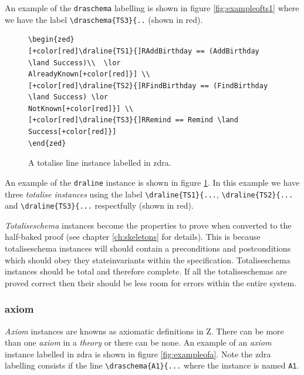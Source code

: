An example of the \verb|draschema| labelling is shown in figure
\ref{fig:exampleofts1} where we have the label \verb|\draschema{TS3}{..| (shown
in red).

\begin{figure}[H]
\centering
\begin{footnotesize}
\begin{BVerbatim}[commandchars=+\[\]]
\begin{zed} 
[+color[red]\draline{TS1}{]RAddBirthday == (AddBirthday \land Success)\\  \lor
AlreadyKnown[+color[red]}] \\
[+color[red]\draline{TS2}{]RFindBirthday == (FindBirthday \land Success) \lor
NotKnown[+color[red]}] \\
[+color[red]\draline{TS3}{]RRemind == Remind \land Success[+color[red]}]
\end{zed}
\end{BVerbatim}
\end{footnotesize}
\caption{\label{fig:exampleofts2} A totalise line instance labelled in \gls{zdra}.}
\end{figure}

An example of the \verb|draline| instance is shown in figure \ref{fig:exampleofts2}. In this example we have three \emph{totalise instances}
using the label \verb|\draline{TS1}{...|, \verb|\draline{TS2}{...| and
\verb|\draline{TS3}{...| respectfully (shown in red).

\emph{Totaliseschema} instances become the properties to prove when converted to the
half-baked proof (see chapter \ref{ch:skeletons} for details). This is because
totaliseschema instances will should contain a preconditions and postconditions
which should obey they stateinvariants within the specification. Totaliseschema
instances should be total and therefore complete. If all the totaliseschemas are
proved correct then their should be less room for errors within the entire
system.

\subsubsection{axiom}

\emph{Axiom} instances are knowns as axiomatic definitions in Z. There can be
more than one \emph{axiom} in a \emph{theory} or there can be none. An example
of an \emph{axiom} instance labelled in \gls{zdra} is shown in figure
\ref{fig:exampleofa}. Note the \gls{zdra} labelling consists if the line
\verb|\draschema{A1}{...| where the instance is named \verb|A1|.

